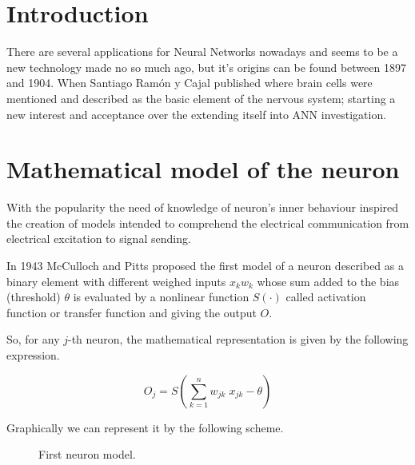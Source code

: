 \section{Introduction}

There are several applications for Neural Networks nowadays and seems to
be a new technology made no so much ago, but it's origins can be found
between 1897 and 1904. When Santiago Ramón y Cajal published
where brain cells were mentioned and described as the basic element of the
nervous system; starting a new interest and acceptance over the
 extending itself into ANN investigation.


\section{Mathematical model of the neuron}

With the  popularity the need of knowledge of
neuron's inner behaviour inspired the creation of models intended to
comprehend the electrical communication from electrical excitation to
signal sending.

In 1943 McCulloch and Pitts \cite{MCCULLOCH199099} proposed the first
model of a neuron described as a binary element with different weighed
inputs $x_k w_k$ whose sum added to the bias (threshold) $\theta$ is
evaluated by a nonlinear function $S(\cdot)$ called activation function or
transfer function and giving the  output $O$.

So, for any $j$-th neuron, the
mathematical representation is given by the following expression.

\begin{equation}
  O_j=S\left( \sum_{k=1}^{n} w_{jk} \; x_{jk}-\theta \right)
\end{equation}

Graphically we can represent it by the following scheme.

\begin{figure}[!ht]
  \centering%
  \caption{First neuron model.}%
  \label{fig::perceptron_i}%
\end{figure}


